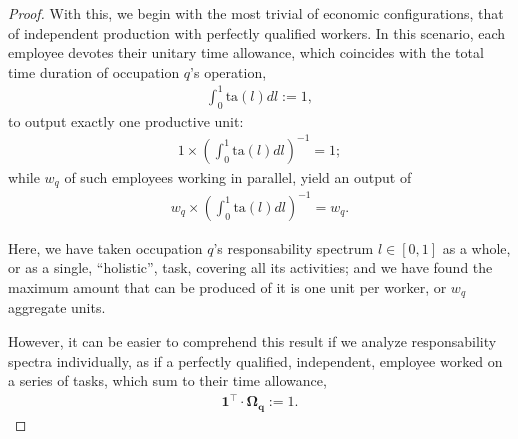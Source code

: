 \documentclass[hidelinks, nonatbib]{elsarticle}
\begin{document}
\begin{lemma}
\begin{proof}
        With this, we begin with the most trivial of economic configurations, that of independent production with perfectly qualified workers. In this scenario, each employee devotes their unitary time allowance, which coincides with the total time duration of occupation $q$'s operation,
        \begin{gather}
            \int_{0}^{1}{
                \text{ta}(l)
                dl
            }
            :=
            1
            ,
        \end{gather}
        to output exactly one productive unit:
        \begin{gather}
            1
            \times
            \left(
                \int_{0}^{1}{
                    \text{ta}(l)dl
                }
            \right) ^ {-1}
            =
            1
            ;
        \end{gather}
        while $w_q$ of such employees working in parallel, yield an output of
        \begin{align}
            w_q 
            \times 
            \left(
                \int_{0}^{1}{
                    \text{ta}(l)dl
                }
            \right) ^ {-1}
            =
            w_q
            .
        \end{align}
        
        Here, we have taken occupation $q$'s responsability spectrum $l \in [0,1]$ as a whole, or as a single, ``holistic'', task, covering all its activities; and we have found the maximum amount that can be produced of it is one unit per worker, or $w_q$ aggregate units.
        
        However, it can be easier to comprehend this result if we analyze responsability spectra individually, as if a perfectly qualified, independent, employee worked on a series of tasks, which sum to their time allowance,
        \begin{gather}
            \boldsymbol{1} ^ {\top}
            \cdot
            \boldsymbol{\Omega_{q}}
            := 
            1
            .
        \end{gather}
        

\end{proof}
\end{lemma}
\end{document}

